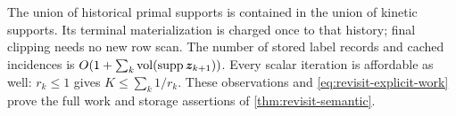 The union of historical primal supports is contained in the union of
kinetic supports. Its terminal materialization is charged once to that
history; final clipping needs no new row scan. The number of stored label
records and cached incidences is $O(1+\sum_k\operatorname{vol}(\operatorname{supp}\bm{z}_{k+1}))$.
Every scalar iteration is affordable as well: $r_k\leq1$ gives
$K\leq\sum_k1/r_k$. These observations and
\cref{eq:revisit-explicit-work} prove the full work and storage assertions
of \cref{thm:revisit-semantic}.

